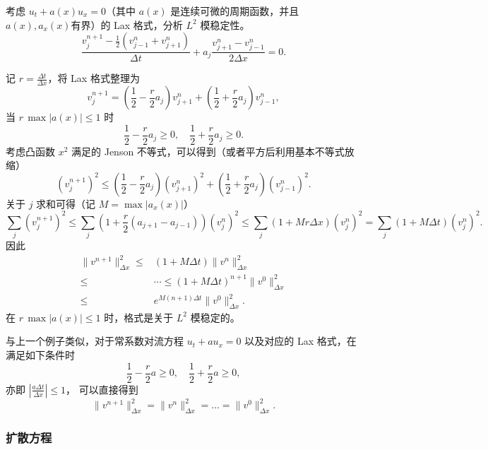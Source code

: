 \begin{example}
    考虑 $u_t+a(x)u_x=0$（其中 $a(x)$ 是连续可微的周期函数，并且$a(x),a_x(x)$有界）的 Lax 格式，分析 $L^2$ 模稳定性。
    \[
        \frac{v^{n+1}_j - \frac12(v_{j-1}^n + v_{j+1}^n)}{\Delta t} +  a_j\frac{v^n_{j+1} - v^n_{j-1}}{2\Delta x} = 0.
    \]
\end{example}

\begin{solution*}
    记 $r = \frac{\Delta t}{\Delta x}$，将 Lax 格式整理为
    \[
        v^{n+1}_j=\left(\frac{1}{2}-\frac{r}{2}a_j\right)v^n_{j+1}+\left(\frac{1}{2}+\frac{r}{2}a_j\right)v^n_{j-1},
    \]
    当 $r\,\max{|a(x)|}\le 1$ 时
    \[
        \frac{1}{2} - \frac{r}{2} a_j \ge 0, \quad \frac{1}{2} + \frac{r}{2} a_j \ge 0.
    \]
    考虑凸函数 $x^2$ 满足的 Jenson 不等式，可以得到（或者平方后利用基本不等式放缩）
    \[
        (v^{n+1}_j)^2\le \left(\frac{1}{2}-\frac{r}{2}a_j\right)(v^n_{j+1})^2+\left(\frac{1}{2}+\frac{r}{2}a_j\right)(v^n_{j-1})^2.
    \]
    关于 $j$ 求和可得（记 $M = \max|a_x(x)|$）
    \[
        \sum_{j}(v^{n+1}_j)^2\le \sum_{j}(1+\frac{r}{2}(a_{j+1}-a_{j-1}))(v^n_{j})^2
        \le \sum_{j}(1+ M r \Delta x)(v^n_{j})^2 = \sum_{j}(1 + M \Delta t)(v^n_{j})^2.
    \]
    因此
    \begin{align*}
        \|v^{n+1}\|_{\Delta x}^2 \le{} & (1 + M \Delta t) \|v^{n}\|_{\Delta x}^2                  \\
        \le{}                          & \cdots \le (1 + M \Delta t)^{n+1} \|v^{0}\|_{\Delta x}^2 \\
        \le{}                          & e^{M (n+1)\Delta t} \|v^{0}\|_{\Delta x}^2.
    \end{align*}
    在 $r\,\max{|a(x)|}\le 1$ 时，格式是关于 $L^2$ 模稳定的。
\end{solution*}

\begin{remark}
    与上一个例子类似，对于常系数对流方程 $u_t + a u_x = 0$ 以及对应的 Lax 格式，在满足如下条件时
    \[
        \frac{1}{2} - \frac{r}{2} a \ge 0,\quad \frac{1}{2} + \frac{r}{2} a \ge 0,
    \]
    亦即 $\left|\frac{a \Delta t}{\Delta x}\right| \le 1$，
    可以直接得到
    \[
        \|v^{n+1}\|_{\Delta x}^2 = \|v^{n}\|_{\Delta x}^2 = \dots = \|v^{0}\|_{\Delta x}^2.
    \]
\end{remark}

\subsubsection{扩散方程}

